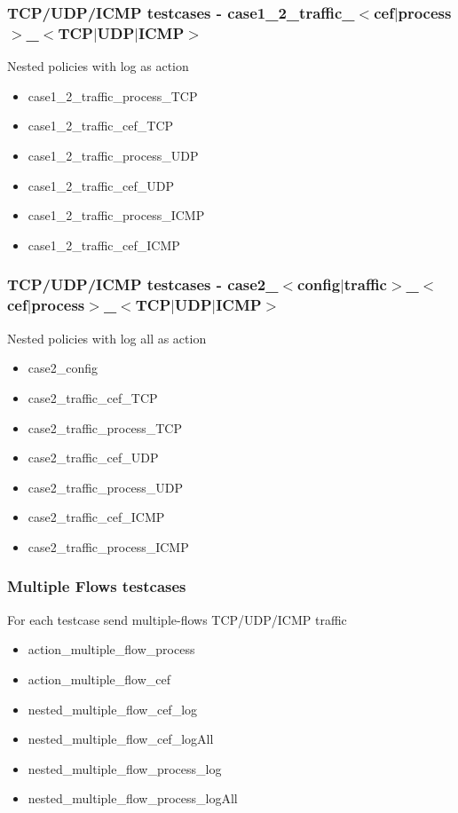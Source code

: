 \documentclass{beamer}
\begin{document}
\begin{frame}[fragile] \frametitle{TCP/UDP/ICMP testcases - case1\_2\_traffic\_$<$cef$|$process$>$\_$<$TCP$|$UDP$|$ICMP$>$}
Nested policies with log as action
\begin{itemize}
	\item case1\_2\_traffic\_process\_TCP
	\item case1\_2\_traffic\_cef\_TCP
	\item case1\_2\_traffic\_process\_UDP
	\item case1\_2\_traffic\_cef\_UDP
	\item case1\_2\_traffic\_process\_ICMP
	\item case1\_2\_traffic\_cef\_ICMP
\end{itemize}
\end{frame}

\begin{frame}[fragile] \frametitle{TCP/UDP/ICMP testcases - case2\_$<$config$|$traffic$>$\_$<$cef$|$process$>$\_$<$TCP$|$UDP$|$ICMP$>$}
Nested policies with log all as action
\begin{itemize}
    \item case2\_config
	\item case2\_traffic\_cef\_TCP
	\item case2\_traffic\_process\_TCP
    \item case2\_traffic\_cef\_UDP
    \item case2\_traffic\_process\_UDP
    \item case2\_traffic\_cef\_ICMP
    \item case2\_traffic\_process\_ICMP
\end{itemize}
\end{frame}

\begin{frame}[fragile] \frametitle{Multiple Flows testcases}
\begin{block}{}
    For each testcase send multiple-flows TCP/UDP/ICMP traffic
\end{block}
\begin{itemize}
    \item action\_multiple\_flow\_process
	\item action\_multiple\_flow\_cef
	\item nested\_multiple\_flow\_cef\_log
    \item nested\_multiple\_flow\_cef\_logAll
    \item nested\_multiple\_flow\_process\_log
    \item nested\_multiple\_flow\_process\_logAll
\end{itemize}
\end{frame}
\end{document}
